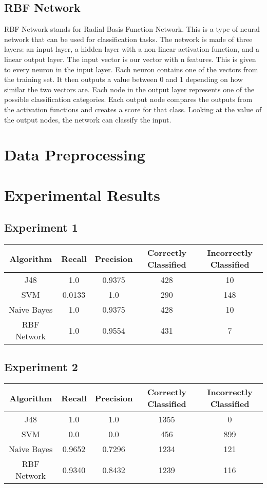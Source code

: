 \documentclass[]{article}
\begin{document}
\subsection{RBF Network}
RBF Network stands for Radial Basis Function Network. This is a type of neural network that can be used for classification tasks. The network is made of three layers: an input layer, a hidden layer with a non-linear activation function, and a linear output layer. The input vector is our vector with n features. This is given to every neuron in the input layer. Each neuron contains one of the vectors from the training set. It then outputs a value between 0 and 1 depending on how similar the two vectors are. Each node in the output layer represents one of the possible classification categories. Each output node compares the outputs from the activation functions and creates a score for that class. Looking at the value of the output nodes, the network can classify the input.

\section{Data Preprocessing}

\section{Experimental Results}
\subsection{Experiment 1}
\begin{tabular}{c | c | c| c | c}
Algorithm & Recall & Precision & Correctly Classified & Incorrectly Classified \\ \hline
J48 & 1.0 & 0.9375 & 428 & 10 \\ 
SVM & 0.0133 & 1.0 & 290 & 148 \\
Naive Bayes & 1.0 & 0.9375 &  428 & 10 \\
RBF Network & 1.0 & 0.9554 & 431 & 7 \\
\end{tabular}
\subsection{Experiment 2}
\begin{tabular}{c | c | c| c | c}
Algorithm & Recall & Precision & Correctly Classified & Incorrectly Classified \\ \hline
J48 & 1.0 & 1.0 & 1355 & 0 \\ 
SVM & 0.0 & 0.0 & 456 & 899 \\
Naive Bayes & 0.9652 & 0.7296 & 1234 & 121 \\
RBF Network & 0.9340 & 0.8432 & 1239 & 116 \\
\end{tabular}
\end{document}
